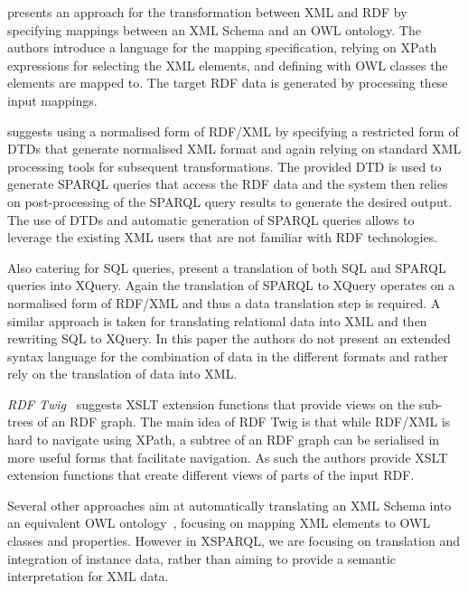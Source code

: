 \citet{DeursenPoppeMartens:2008aa} presents an approach for the transformation between \ac{XML} and \ac{RDF} by
specifying mappings between an XML Schema and an \ac{OWL} ontology.
%
The authors introduce a language for the mapping specification, relying on XPath expressions for selecting the \ac{XML}
elements, and defining with \ac{OWL} classes the elements are mapped to.  The target \ac{RDF} data is generated by
processing these input mappings.

\citet{VrandecicDenglerRudolph:2005aa} suggests using a normalised form of RDF/XML by specifying a restricted form of
\acp{DTD} that generate normalised \ac{XML} format and again relying on standard \ac{XML} processing tools for
subsequent transformations.  The provided \ac{DTD} is used to generate SPARQL queries that access the \ac{RDF} data and
the system then relies on post-processing of the SPARQL query results to generate the desired output.  The use of
\acp{DTD} and automatic generation of SPARQL queries allows to leverage the existing \ac{XML} users that are not
familiar with \ac{RDF} technologies.


Also catering for \ac{SQL} queries, \citet{FischerFlorescuKaufmann:2011aa} present a translation of both \ac{SQL} and
SPARQL queries into XQuery.  Again the translation of SPARQL to XQuery operates on a normalised form of RDF/XML and thus
a data translation step is required.  A similar approach is taken for translating relational data into \ac{XML} and then
rewriting \ac{SQL} to XQuery.  In this paper the authors do not present an extended syntax language for the combination
of data in the different formats and rather rely on the translation of data into \ac{XML}.


\emph{RDF Twig}~\cite{Walsh:2003aa} suggests \ac{XSLT} extension functions that provide views on the sub-trees of an RDF
graph. 
%
The main idea of \ac{RDF} Twig is that while RDF/XML is hard to navigate using XPath, a subtree of an \ac{RDF} graph can
be serialised in more useful forms that facilitate navigation.  As such the authors provide \ac{XSLT} extension
functions that create different views of parts of the input \ac{RDF}.



Several other approaches aim at automatically translating an \ac{XML} Schema into an equivalent \ac{OWL}
ontology~\cite{BohringAuer:2005aa,RodriguesRosaCardoso:2008aa}, focusing on mapping \ac{XML} elements to \ac{OWL}
classes and properties.
%
However in XSPARQL, we are focusing on translation and integration of instance data, rather than aiming to provide a
semantic interpretation for \ac{XML} data.


